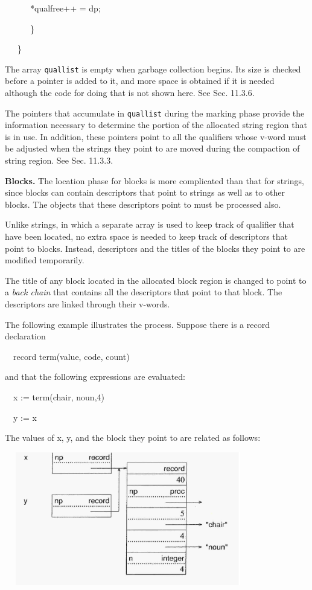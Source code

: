 {\ttfamily\mdseries
\ \ \ \ \ \ *qualfree++ = dp;}

{\ttfamily\mdseries
\ \ \ \ \ \ \}}

{\ttfamily\mdseries
\ \ \ \}}


The array \texttt{quallist} is empty when garbage collection
begins. Its size is checked before a pointer is added to it, and more
space is obtained if it is needed although the code for doing that is
not shown here. See Sec. 11.3.6.

The pointers that accumulate in \texttt{quallist} during the marking
phase provide the information necessary to determine the portion of
the allocated string region that is in use. In addition, these
pointers point to all the qualifiers whose v-word must be adjusted
when the strings they point to are moved during the compaction of
string region. See Sec. 11.3.3.

\textbf{Blocks. }The location phase for blocks is more complicated
than that for strings, since blocks can contain descriptors that point
to strings as well as to other blocks. The objects that these
descriptors point to must be processed also.

Unlike strings, in which a separate array is used to keep track of
qualifier that have been located, no extra space is needed to keep
track of descriptors that point to blocks. Instead, descriptors and
the titles of the blocks they point to are modified temporarily.

The title of any block located in the allocated block region is
changed to point to a \textit{back chain} that contains all the
descriptors that point to that block. The descriptors are linked
through their v-words.

The following example illustrates the process. Suppose there is a
record declaration

{\ttfamily\mdseries
\ \ record term(value, code, count)}

\noindent
and that the following expressions are evaluated:

{\ttfamily\mdseries
\ \ x := term({\textquotedbl}chair{\textquotedbl}, {\textquotedbl}noun{\textquotedbl},4)}

{\ttfamily\mdseries
\ \ y := x}

The values of x, y, and the block they point to are related as follows:

\ \  \includegraphics[width=3.9543in,height=2.2937in]{ib-img/ib-img090.jpg} 

